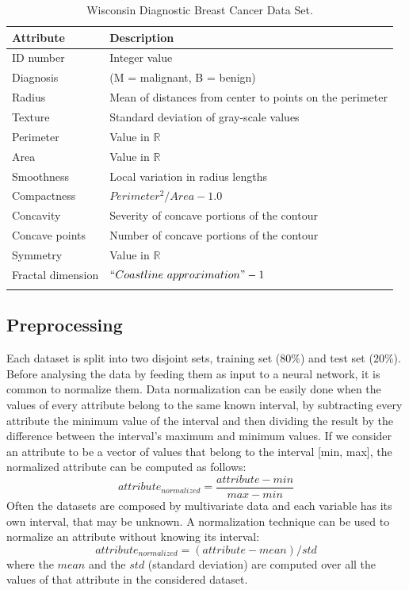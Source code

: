 \documentclass[10pt,journal,A4paper,compsoc,epsfig]{IEEEtran}
\begin{document}
\begin{table}
\centering
\begin{tabular}{l l}
Attribute & Description \\
\hline
\noalign{\medskip}
ID number & Integer value \\
\noalign{\smallskip}
Diagnosis & (M = malignant, B = benign) \\
\noalign{\smallskip}
Radius & \parbox[t]{5cm}{Mean of distances from center to points on the perimeter} \\
\noalign{\smallskip}
Texture & Standard deviation of gray-scale values \\
\noalign{\smallskip}
Perimeter & Value in $\mathbb{R}$ \\
\noalign{\smallskip}
Area & Value in $\mathbb{R}$ \\
\noalign{\smallskip}
Smoothness & Local variation in radius lengths \\
\noalign{\smallskip}
Compactness & $Perimeter^2 / Area - 1.0$ \\
\noalign{\smallskip}
Concavity & Severity of concave portions of the contour \\
\noalign{\smallskip}
Concave points & Number of concave portions of the contour \\
\noalign{\smallskip}
Symmetry & Value in $\mathbb{R}$ \\
\noalign{\smallskip}
Fractal dimension & $``Coastline{\ }approximation" - 1$ \\
\noalign{\smallskip}
\hline
\end{tabular}
\caption{Wisconsin Diagnostic Breast Cancer Data Set.}
\label{table_cancer_dataset}
\end{table}%


\subsection{Preprocessing}

Each dataset is split into two disjoint sets, training set ($80\%$) and test set ($20\%$).
Before analysing the data by feeding them as input to a neural network, it is common to normalize them. Data normalization can be easily done when the values of every attribute belong to the same known interval, by subtracting every attribute the minimum value of the interval and then dividing the result by the difference between the interval's maximum and minimum values. If we consider an attribute to be a vector of values that belong to the interval [min, max], the normalized attribute can be computed as follows:
\begin{equation}
attribute_{normalized} = \dfrac{attribute - min}{max - min}
\end{equation}
Often the datasets are composed by multivariate data and each variable has its own interval, that may be unknown.
A normalization technique can be used to normalize an attribute without knowing its interval:
\begin{equation}
attribute_{normalized} = (attribute - mean)/std
\end{equation}
where the $mean$ and the $std$ (standard deviation) are computed over all the values of that attribute in the considered dataset.
\end{document}
